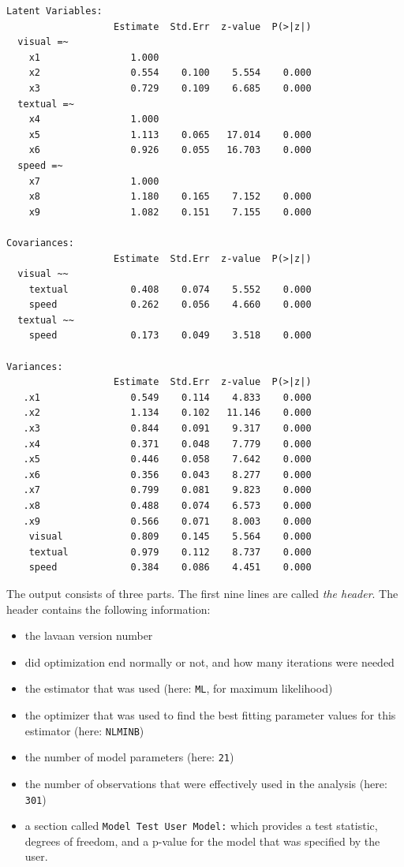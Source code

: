 \begin{verbatim}
Latent Variables:
                   Estimate  Std.Err  z-value  P(>|z|)
  visual =~                                           
    x1                1.000                           
    x2                0.554    0.100    5.554    0.000
    x3                0.729    0.109    6.685    0.000
  textual =~                                          
    x4                1.000                           
    x5                1.113    0.065   17.014    0.000
    x6                0.926    0.055   16.703    0.000
  speed =~                                            
    x7                1.000                           
    x8                1.180    0.165    7.152    0.000
    x9                1.082    0.151    7.155    0.000

Covariances:
                   Estimate  Std.Err  z-value  P(>|z|)
  visual ~~                                           
    textual           0.408    0.074    5.552    0.000
    speed             0.262    0.056    4.660    0.000
  textual ~~                                          
    speed             0.173    0.049    3.518    0.000

Variances:
                   Estimate  Std.Err  z-value  P(>|z|)
   .x1                0.549    0.114    4.833    0.000
   .x2                1.134    0.102   11.146    0.000
   .x3                0.844    0.091    9.317    0.000
   .x4                0.371    0.048    7.779    0.000
   .x5                0.446    0.058    7.642    0.000
   .x6                0.356    0.043    8.277    0.000
   .x7                0.799    0.081    9.823    0.000
   .x8                0.488    0.074    6.573    0.000
   .x9                0.566    0.071    8.003    0.000
    visual            0.809    0.145    5.564    0.000
    textual           0.979    0.112    8.737    0.000
    speed             0.384    0.086    4.451    0.000
\end{verbatim}

The output consists of three parts. The first nine lines are called
\emph{the header}. The header contains the following information:

\begin{itemize}
\tightlist
\item
  the lavaan version number
\item
  did optimization end normally or not, and how many iterations were
  needed
\item
  the estimator that was used (here: \texttt{ML}, for maximum
  likelihood)
\item
  the optimizer that was used to find the best fitting parameter values
  for this estimator (here: \texttt{NLMINB})
\item
  the number of model parameters (here: \texttt{21})
\item
  the number of observations that were effectively used in the analysis
  (here: \texttt{301})
\item
  a section called \texttt{Model\ Test\ User\ Model:} which provides a
  test statistic, degrees of freedom, and a p-value for the model that
  was specified by the user.
\end{itemize}

